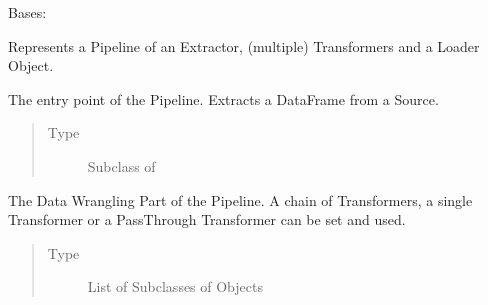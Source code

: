 \documentclass[a4paper,10pt, twoside,english]{sphinxmanual}
\begin{document}
\begin{fulllineitems}
\label{\detokenize{pipeline/pipeline:spooq2.pipeline.pipeline.Pipeline}}
Bases: 

Represents a Pipeline of an Extractor, (multiple) Transformers and a Loader Object.

\begin{fulllineitems}
\label{\detokenize{pipeline/pipeline:spooq2.pipeline.pipeline.Pipeline.extractor}}
The entry point of the Pipeline. Extracts a DataFrame from a Source.
\begin{quote}\begin{description}
\item[{Type}] \leavevmode
Subclass of 

\end{description}\end{quote}

\end{fulllineitems}


\begin{fulllineitems}
\label{\detokenize{pipeline/pipeline:spooq2.pipeline.pipeline.Pipeline.transformers}}
The Data Wrangling Part of the Pipeline. A chain of Transformers, a single Transformer
or a PassThrough Transformer can be set and used.
\begin{quote}\begin{description}
\item[{Type}] \leavevmode
List of Subclasses of  Objects

\end{description}\end{quote}

\end{fulllineitems}



\end{fulllineitems}
\end{document}

